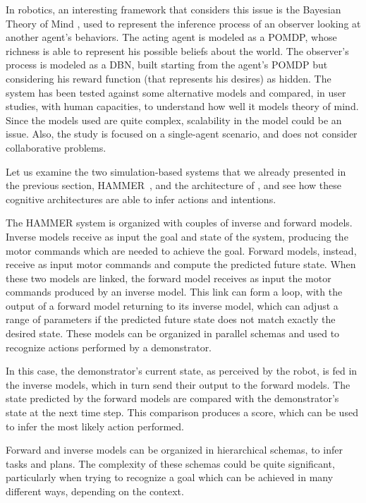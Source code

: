 In robotics, an interesting framework that considers this issue is the Bayesian Theory of Mind \citep{baker2014modeling}, used to represent the inference process of an observer looking at another agent's behaviors. The acting agent is modeled as a POMDP, whose richness is able to represent his possible beliefs about the world. The observer's process is modeled as a DBN, built starting from the agent's POMDP but considering his reward function (that represents his desires) as hidden. The system has been tested against some alternative models and compared, in user studies, with human capacities, to understand how well it models theory of mind. Since the models used are quite complex, scalability in the model could be an issue. Also, the study is focused on a single-agent scenario, and does not consider collaborative problems.

Let us examine the two simulation-based systems that we already presented in the previous section, HAMMER~\citep{demiris2007prediction}, and the architecture of \cite{BreazealGB09}, and see how these cognitive architectures are able to infer actions and intentions.

The HAMMER system is organized with couples of inverse and forward models.  Inverse models receive as input the goal and state of the system, producing the motor commands which are needed to achieve the goal. Forward models, instead, receive as input motor commands and compute the predicted future state. When these two models are linked, the forward model receives as input the motor commands produced by an inverse model. This link can form a loop, with the output of a forward model returning to its inverse model, which can adjust a range of parameters if the predicted future state does not match exactly the desired state. These models can be organized in parallel schemas and used to recognize actions performed by a demonstrator. 

In this case, the demonstrator's current state, as perceived by the robot, is fed in the inverse models, which in turn send their output to the forward models. The state predicted by the forward models are compared with the demonstrator's state at the next time step. This comparison produces a score, which can be used to infer the most likely action performed. 

Forward and inverse models can be organized in hierarchical schemas, to infer tasks and plans. The complexity of these schemas could be quite significant, particularly when trying to recognize a goal which can be achieved in many different ways, depending on the context. 

